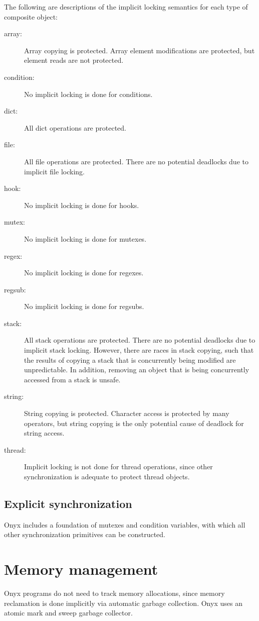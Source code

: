 The following are descriptions of the implicit locking semantics for each type
of composite object:
\begin{description}
\item[array: ] Array copying is protected.  Array element modifications are
protected, but element reads are not protected.
\item[condition: ] No implicit locking is done for conditions.
\item[dict: ] All dict operations are protected.
\item[file: ] All file operations are protected.  There are no potential
deadlocks due to implicit file locking.
\item[hook: ] No implicit locking is done for hooks.
\item[mutex: ] No implicit locking is done for mutexes.
\item[regex: ] No implicit locking is done for regexes.
\item[regsub: ] No implicit locking is done for regsubs.
\item[stack: ] All stack operations are protected.  There are no potential
deadlocks due to implicit stack locking.  However, there are races in stack
copying, such that the results of copying a stack that is concurrently being
modified are unpredictable.  In addition, removing an object that is being
concurrently accessed from a stack is unsafe.
\item[string: ] String copying is protected.  Character access is protected by
many operators, but string copying is the only potential cause of deadlock for
string access.
\item[thread: ]  Implicit locking is not done for thread operations, since other
synchronization is adequate to protect thread objects.
\end{description}

\subsection{Explicit synchronization}

Onyx includes a foundation of mutexes and condition variables, with which all
other synchronization primitives can be constructed.

\section{Memory management}
Onyx programs do not need to track memory allocations, since memory reclamation
is done implicitly via automatic garbage collection.  Onyx uses an atomic mark
and sweep garbage collector.

